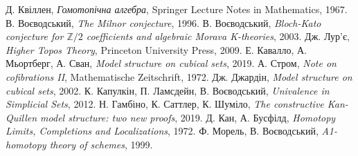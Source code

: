 \documentclass[12pt]{article}
\theoremstyle{plain}
\theoremstyle{definition}
\theoremstyle{remark}
\begin{document}
\begin{thebibliography}{9}
 Д. Квіллен, \emph{Гомотопічна алгебра}, Springer Lecture Notes in Mathematics, 1967.
 В. Воєводський, \emph{The Milnor conjecture}, 1996.
 В. Воєводський, \emph{Bloch-Kato conjecture for $\mathbb{Z}/2$ coefficients and algebraic Morava K-theories}, 2003.
 Дж. Лур’є, \emph{Higher Topos Theory}, Princeton University Press, 2009.
 Е. Кавалло, А. Мьортберг, А. Сван, \emph{Model structure on cubical sets}, 2019.
 А. Стром, \emph{Note on cofibrations II}, Mathematische Zeitschrift, 1972.
 Дж. Джардін, \emph{Model structure on cubical sets}, 2002.
 К. Капулкін, П. Ламсдейн, В. Воєводський, \emph{Univalence in Simplicial Sets}, 2012.
 Н. Гамбіно, К. Саттлер, К. Шуміло, \emph{The constructive Kan-Quillen model structure: two new proofs}, 2019.
 Д. Кан, А. Бусфілд, \emph{Homotopy Limits, Completions and Localizations}, 1972.
 Ф. Морель, В. Воєводський, \emph{A1-homotopy theory of schemes}, 1999.
\end{thebibliography}
\end{document}

